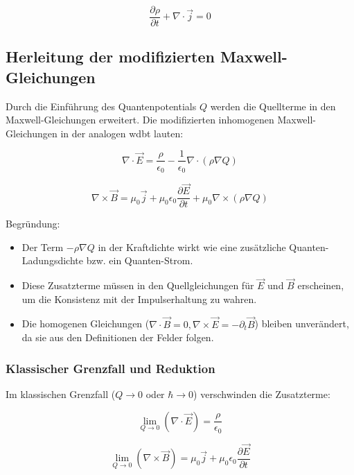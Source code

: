 \begin{equation}
    \frac{\partial \rho}{\partial t} + \nabla \cdot \vec{j} = 0
\end{equation}

\subsection{Herleitung der modifizierten Maxwell-Gleichungen}
Durch die Einführung des Quantenpotentials $Q$ werden die Quellterme in den Maxwell-Gleichungen erweitert. Die modifizierten inhomogenen Maxwell-Gleichungen in der analogen \gls{wdbt} lauten:

\begin{equation}
    \nabla \cdot \vec{E} = \frac{\rho}{\epsilon_0} - \frac{1}{\epsilon_0} \nabla \cdot (\rho \nabla Q)
\end{equation}

\begin{equation}
    \nabla \times \vec{B} = \mu_0 \vec{j} + \mu_0 \epsilon_0 \frac{\partial \vec{E}}{\partial t} + \mu_0 \nabla \times (\rho \nabla Q)
\end{equation}

Begründung:

\begin{itemize}
    \item Der Term $-\rho \nabla Q$ in der Kraftdichte wirkt wie eine zusätzliche Quanten-Ladungsdichte bzw. ein Quanten-Strom.
    \item Diese Zusatzterme müssen in den Quellgleichungen für $\vec{E}$ und $\vec{B}$ erscheinen, um die Konsistenz mit der Impulserhaltung zu wahren.
    \item Die homogenen Gleichungen ($\nabla \cdot \vec{B} = 0, \nabla \times \vec{E} = -\partial_t \vec{B}$) bleiben unverändert, da sie aus den Definitionen der Felder folgen.
\end{itemize}

\subsubsection{Klassischer Grenzfall und Reduktion}
Im klassischen Grenzfall ($Q \to 0$ oder $\hbar \to 0$) verschwinden die Zusatzterme:

\begin{equation}
    \lim_{Q \to 0} \left( \nabla \cdot \vec{E} \right) = \frac{\rho}{\epsilon_0}
\end{equation}

\begin{equation}
    \lim_{Q \to 0} \left( \nabla \times \vec{B} \right) = \mu_0 \vec{j} + \mu_0 \epsilon_0 \frac{\partial \vec{E}}{\partial t}
\end{equation}


